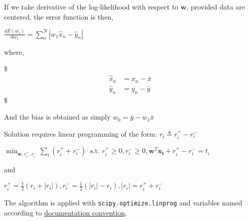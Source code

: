 \documentclass[11pt]{article}
\begin{document}
If we take derivative of the log-likelihood with respect to
\(\mathbf{w}\), provided data are centered, the error function is then,

\(\frac{dE(w_1)}{dw_1} = \sum_n^N|w_1\hat{x}_{n} - \hat{y}_n|\)

where,

\$\begin{align}
    \hat{x}_n &= x_n - \bar{x}\\
    \hat{y}_n &= y_n - \bar{y}
\end{align} \$

And the bias is obtained as simply \(w_0 = \bar{y} - w_1\bar{x}\)

Solution requires linear programming of the form:
\(r_i \triangleq r_i^+ - r_i^-\)

\(\min_{\mathbf{w}, r_i^+, r_i^-}\sum_{i}(r_i^++r_i^-)\ \text{  s.t.  } r_i^+\geq 0,r_i^-\geq 0, \mathbf{w}^T\mathbf{x_i} + r_i^+-r_i^- = t_i\)

and

\(r_i^+ = \frac{1}{2}(r_i + |r_i|), r_i^- = \frac{1}{2}(|r_i|-r_i), |r_i| = r_i^+ + r_i^-\)

The algorithm is applied with \texttt{scipy.optimize.linprog} and
variables named according to
\href{https://docs.scipy.org/doc/scipy/reference/generated/scipy.optimize.linprog.html}{documentation
convention}.
\end{document}
